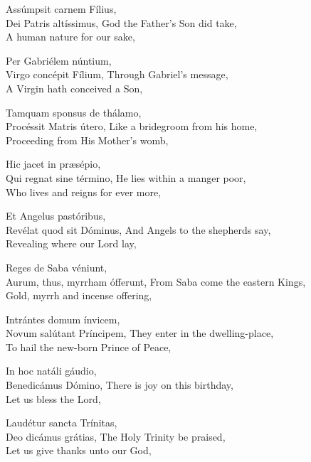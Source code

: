 \setlength{\englishwidth}{0.5\textwidth}
\setlength{\latinwidth}{0.48\textwidth}
\setlength{\preverseskip}{5pt}

Assúmpsit carnem Fílius,\\
Dei Patris altíssimus,
\divverse
God the Father’s Son did take,\\
A human nature for our sake,
\finishverse

 Per Gabriélem núntium,\\
Virgo concépit Fílium,
\divverse
Through Gabriel’s message,\\
A Virgin hath conceived a Son,
\finishverse


Tamquam sponsus de
thálamo,\\
Procéssit Matris útero,
\divverse
Like a bridegroom from his home,\\
Proceeding from His Mother’s
womb,
\finishverse



Hic jacet in præsépio,\\
Qui regnat sine término,
\divverse
He lies within a manger poor,\\
Who lives and reigns for ever more,
\finishverse



Et Angelus pastóribus,\\
Revélat quod sit Dóminus,
\divverse
And Angels to the shepherds say,\\
Revealing where our Lord lay,
\finishverse


Reges de Saba véniunt,\\
Aurum, thus, myrrham
ófferunt,
\divverse
From Saba come the eastern Kings,\\
Gold, myrrh and incense offering,
\finishverse



Intrántes domum ínvicem,\\
Novum salútant Príncipem,
\divverse
They enter in the dwelling-place,\\
To hail the new-born Prince of
Peace,
\finishverse



In hoc natáli gáudio,\\
Benedicámus Dómino,
\divverse
There is joy on this birthday,\\
Let us bless the Lord,
\finishverse

Laudétur sancta Trínitas,\\
Deo dicámus grátias,
\divverse
The Holy Trinity be praised,\\
Let us give thanks unto our God,
\finishverse

\bigskip


\setlength{\englishwidth}{0.5\textwidth}
\setlength{\latinwidth}{0.48\textwidth}
\setlength{\preverseskip}{10pt}
